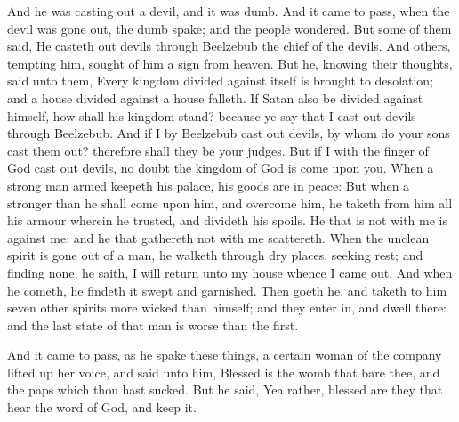  And he was casting out a devil, and it was dumb. And it
came to pass, when the devil was gone out, the dumb spake; and the
people wondered.  But some of them said, He casteth out
devils through Beelzebub the chief of the devils.  And
others, tempting him, sought of him a sign from heaven. 
But he, knowing their thoughts, said unto them, Every kingdom divided
against itself is brought to desolation; and a house divided against a
house falleth.  If Satan also be divided against himself,
how shall his kingdom stand? because ye say that I cast out devils
through Beelzebub.  And if I by Beelzebub cast out devils,
by whom do your sons cast them out? therefore shall they be your judges.
 But if I with the finger of God cast out devils, no doubt
the kingdom of God is come upon you.  When a strong man
armed keepeth his palace, his goods are in peace:  But when
a stronger than he shall come upon him, and overcome him, he taketh from
him all his armour wherein he trusted, and divideth his spoils.
 He that is not with me is against me: and he that
gathereth not with me scattereth.  When the unclean spirit
is gone out of a man, he walketh through dry places, seeking rest; and
finding none, he saith, I will return unto my house whence I came out.
 And when he cometh, he findeth it swept and garnished.
 Then goeth he, and taketh to him seven other spirits more
wicked than himself; and they enter in, and dwell there: and the last
state of that man is worse than the first.

 And it came to pass, as he spake these things, a certain
woman of the company lifted up her voice, and said unto him, Blessed is
the womb that bare thee, and the paps which thou hast sucked.
 But he said, Yea rather, blessed are they that hear the
word of God, and keep it.

